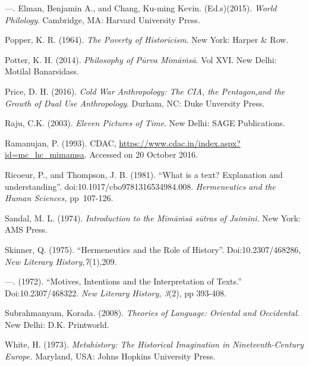 \begin{thebibliography}{99}
  —. Elman, Benjamin A., and Chang, Ku-ming Kevin. (Ed.s)(2015). \textit{World Philology}. Cambridge, MA: Harvard University Press.

  Popper, K. R. (1964). \textit{The Poverty of Historicism}. New York: Harper \& Row.

  Potter, K. H. (2014). \textit{Philosophy of Pūrva Mīmāṁsā}. Vol XVI. New Delhi: Motilal Banarsidass.

  Price, D. H. (2016). \textit{Cold War Anthropology: The CIA, the Pentagon,and the Growth of Dual Use Anthropology}. Durham, NC: Duke Unversity Press.

  Raju, C.K. (2003). \textit{Eleven Pictures of Time}. New Delhi: SAGE Publications.

  Ramanujan, P. (1993). CDAC, \url{https://www.cdac.in/index.aspx?id=mc_hc_mimamsa}. Accessed on 20 October 2016.

  Ricoeur, P., and Thompson, J. B. (1981). “What is a text? Explanation and understanding”. doi:10.1017/cbo9781316534984.008. \textit{Hermeneutics and the Human Sciences,} pp~107-126.

  Sandal, M. L. (1974). \textit{Introduction to the Mīmāṁsā sūtras of Jaimini}. New York: AMS Press.

  Skinner, Q. (1975). “Hermeneutics and the Role of History”. Doi:10.2307/468286, \textit{New Literary History,7}(1),209.

  —. (1972). “Motives, Intentions and the Interpretation of Texts.” Doi:10.2307/468322. \textit{New Literary History, 3}(2), pp 393-408.

  Subrahmanyam, Korada. (2008). \textit{Theories of Language: Oriental and Occidental}. New Delhi: D.K. Printworld.

  White, H. (1973). \textit{Metahistory: The Historical Imagination in Nineteenth-Century Europe.} Maryland, USA: Johns Hopkins University Press.

 \end{thebibliography}

\theendnotes

